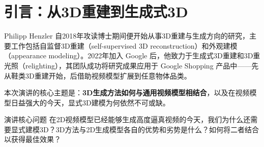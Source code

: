 \section{引言：从3D重建到生成式3D}

Philipp Henzler 自2018年攻读博士期间便开始从事3D重建与生成方向的研究，主要工作包括自监督3D重建（self-supervised 3D reconstruction）和外观建模（appearance modeling）。2022年加入 Google 后，他致力于生成式3D重建和3D重光照（relighting），其团队成功将研究成果应用于 Google Shopping 产品中——先从鞋类3D重建开始，后借助视频模型扩展到任意物体品类。

本次演讲的核心主题是：\textbf{3D生成方法如何与通用视频模型相结合}，以及在视频模型日益强大的今天，显式3D建模为何依然不可或缺。

\begin{importantbox}{演讲核心问题}
在2D视频模型已经能够生成高度逼真视频的今天，我们为什么还需要显式建模3D？3D方法与2D生成模型各自的优势和劣势是什么？如何将二者结合以获得最佳效果？
\end{importantbox}

